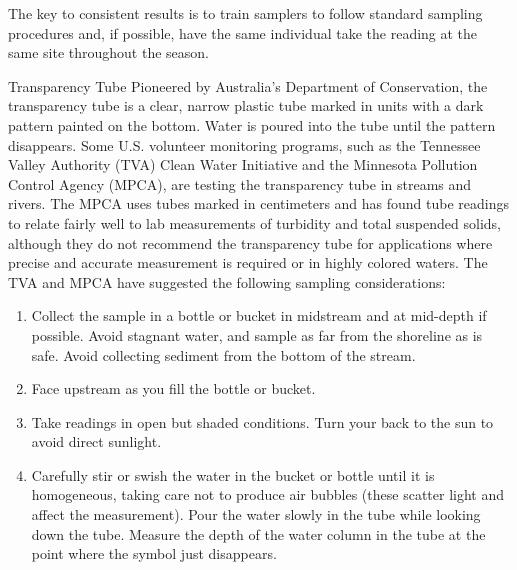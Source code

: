 \documentclass{article}
\begin{document}
The key to consistent results is to train samplers to follow standard
sampling procedures and, if possible, have the same individual take the
reading at the same site throughout the season.

Transparency Tube Pioneered by Australia's Department of Conservation,
the transparency tube is a clear, narrow plastic tube marked in units
with a dark pattern painted on the bottom. Water is poured into the tube
until the pattern disappears. Some U.S. volunteer monitoring programs,
such as the Tennessee Valley Authority (TVA) Clean Water Initiative and
the Minnesota Pollution Control Agency (MPCA), are testing the
transparency tube in streams and rivers. The MPCA uses tubes marked in
centimeters and has found tube readings to relate fairly well to lab
measurements of turbidity and total suspended solids, although they do
not recommend the transparency tube for applications where precise and
accurate measurement is required or in highly colored waters. The TVA
and MPCA have suggested the following sampling considerations:

\begin{enumerate}
\def\labelenumi{\arabic{enumi}.}
\tightlist
\item
  Collect the sample in a bottle or bucket in midstream and at mid-depth
  if possible. Avoid stagnant water, and sample as far from the
  shoreline as is safe. Avoid collecting sediment from the bottom of the
  stream.
\item
  Face upstream as you fill the bottle or bucket.
\item
  Take readings in open but shaded conditions. Turn your back to the sun
  to avoid direct sunlight.
\item
  Carefully stir or swish the water in the bucket or bottle until it is
  homogeneous, taking care not to produce air bubbles (these scatter
  light and affect the measurement). Pour the water slowly in the tube
  while looking down the tube. Measure the depth of the water column in
  the tube at the point where the symbol just disappears.
\end{enumerate}
\end{document}
